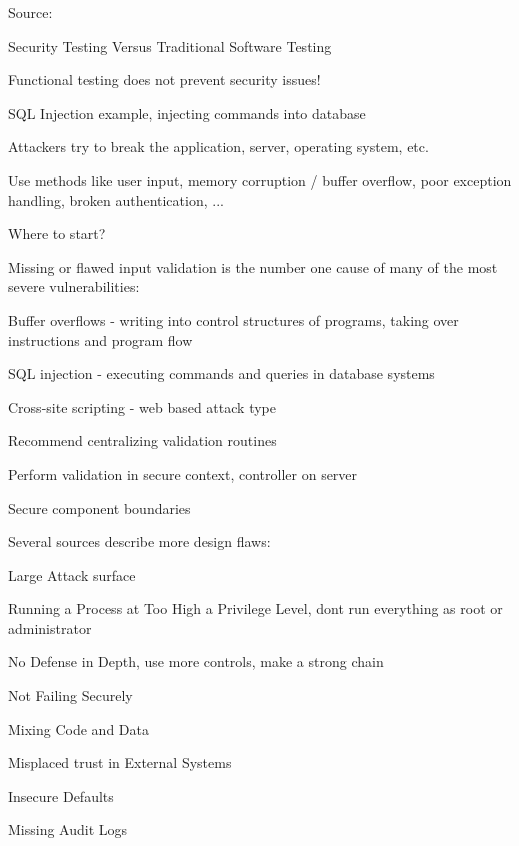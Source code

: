 \documentclass[Screen16to9,17pt]{foils}
\begin{document}
Source: 







\begin{list2}
\item Security Testing Versus Traditional Software Testing
\item Functional testing does not prevent security issues!
\item SQL Injection example, injecting commands into database
\item Attackers try to break the application, server, operating system, etc.
\item Use methods like user input, memory corruption / buffer overflow, poor exception handling, broken authentication, ...
\end{list2}

\vskip 2cm
\centerline{\LARGE Where to start?}



Missing or flawed input validation is the number one cause of many of the most severe vulnerabilities:
\begin{list2}
\item Buffer overflows - writing into control structures of programs, taking over instructions and program flow
\item SQL injection - executing commands and queries in database systems
\item Cross-site scripting - web based attack type
\item Recommend centralizing validation routines
\item Perform validation in secure context, controller on server
\item Secure component boundaries
\end{list2}


Several sources describe more design flaws:
\begin{list2}
\item Large Attack surface
\item Running a Process at Too High a Privilege Level, dont run everything as root or administrator
\item No Defense in Depth, use more controls, make a strong chain
\item Not Failing Securely
\item Mixing Code and Data
\item Misplaced trust in External Systems
\item Insecure Defaults
\item Missing Audit Logs
\end{list2}
\end{document}
